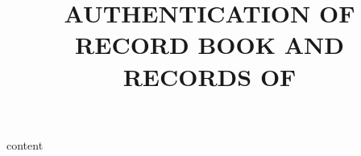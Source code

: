 \documentclass[12pt]{scrartcl}
\title{AUTHENTICATION OF RECORD BOOK AND RECORDS OF\\\companyName}
\begin{document}
\maketitle
{content}
\end{document}
